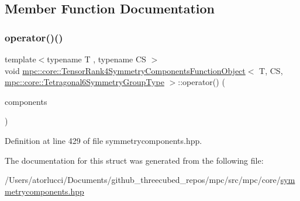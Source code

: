 \subsection{Member Function Documentation}
\mbox{\label{structmpc_1_1core_1_1_tensor_rank4_symmetry_components_function_object_3_01_t_00_01_c_s_00_01mpcb35265619212e0eab46a619a1df412a3_a2325e8e7b5be33a8cb7c27698bd179d5}} 
\subsubsection{\texorpdfstring{operator()()}{operator()()}}
{\footnotesize\ttfamily template$<$typename T , typename CS $>$ \\
void \mbox{\hyperlink{structmpc_1_1core_1_1_tensor_rank4_symmetry_components_function_object}{mpc\+::core\+::\+Tensor\+Rank4\+Symmetry\+Components\+Function\+Object}}$<$ T, CS, \mbox{\hyperlink{structmpc_1_1core_1_1_tetragonal6_symmetry_group_type}{mpc\+::core\+::\+Tetragonal6\+Symmetry\+Group\+Type}} $>$\+::operator() (\begin{DoxyParamCaption}\item[{std\+::set$<$ \mbox{\hyperlink{classmpc_1_1core_1_1_tensor_rank_n_component}{mpc\+::core\+::\+Tensor\+Rank\+N\+Component}}$<$ T, 4 $>$ $>$ \&}]{components }\end{DoxyParamCaption})\hspace{0.3cm}{\ttfamily [inline]}}



Definition at line 429 of file symmetrycomponents.\+hpp.



The documentation for this struct was generated from the following file\+:\begin{DoxyCompactItemize}
\item 
/\+Users/atorlucci/\+Documents/github\+\_\+threecubed\+\_\+repos/mpc/src/mpc/core/\mbox{\hyperlink{symmetrycomponents_8hpp}{symmetrycomponents.\+hpp}}\end{DoxyCompactItemize}
